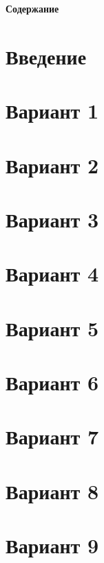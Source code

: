 \documentclass[12pt]{article}
\begin{document}
%
\large

\vspace*{5cm}

\renewcommand{\contentsname}{}

\centerline{\textbf{Содержание}}

\vspace*{1cm}

\tableofcontents

\newpage

\section*{Введение}

\section{Вариант 1}

\section{Вариант 2}

\section{Вариант 3}

\section{Вариант 4}

\section{Вариант 5}

\section{Вариант 6}

\section{Вариант 7}

\section{Вариант 8}

\section{Вариант 9}
\end{document}
